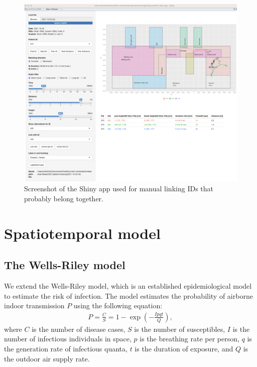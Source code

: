 \documentclass[fleqn,11pt]{wlscirep_supp}
\begin{document}
\begin{figure}[!htpb]
    \centering
    \includegraphics[width=\linewidth]{doc/paper/shiny-tool-screenshot.png}
    \caption{Screenshot of the Shiny app used for manual linking IDs that probably belong together.}
    \label{fig:shiny-app}
\end{figure}

\clearpage

\section{Spatiotemporal model}\label{sec:spattemp-model}

\subsection{The Wells-Riley model}

We extend the Wells-Riley model\cite{Riley1978AJE}, which is an established epidemiological model to estimate the risk of infection. The model estimates the probability of airborne indoor transmission $P$ using the following equation: 
\begin{align}
    P = \frac{C}{S} = 1 - \exp \left(-\frac{Ipqt}{Q}\right),
\end{align}
where $C$ is the number of disease cases, $S$ is the number of susceptibles, $I$ is the number of infectious individuals in space, $p$ is the breathing rate per person, $q$ is the generation rate of infectious quanta, $t$ is the duration of exposure, and $Q$ is the outdoor air supply rate. 
\end{document}

